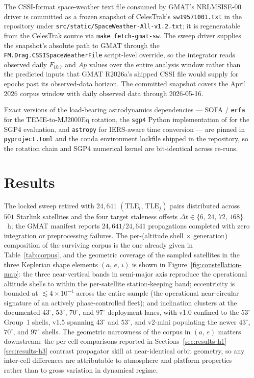 \documentclass[10pt, letterpaper]{article}
\begin{document}
The CSSI-format space-weather text file consumed by GMAT's NRLMSISE-00
driver is committed as a frozen snapshot of CelesTrak's
\texttt{sw19571001.txt} in the repository under
\texttt{src/static/\allowbreak SpaceWeather-\allowbreak All-\allowbreak v1.2.\allowbreak txt}; it is regeneratable
from the CelesTrak source via \texttt{make fetch-gmat-sw}. The sweep
driver supplies the snapshot's absolute path to GMAT through the
\texttt{FM.Drag.\allowbreak CSSISpaceWeatherFile} script-level
override, so the integrator reads observed daily $F_{10.7}$ and $Ap$
values over the entire analysis window rather than the predicted
inputs that GMAT R2026a's shipped CSSI file would supply for epochs
past its observed-data horizon. The committed snapshot covers the
April 2026 corpus window with daily observed data through 2026-05-16.

Exact versions of the load-bearing
astrodynamics dependencies --- SOFA / \texttt{erfa} for the
TEME-to-MJ2000Eq rotation, the \texttt{sgp4} Python implementation
of \citet{rhodes_sgp4} for the SGP4 evaluation, and \texttt{astropy}
for IERS-aware time conversion --- are pinned in
\texttt{pyproject.toml} and the conda environment lockfile shipped
in the repository, so the rotation chain and SGP4 numerical kernel
are bit-identical across re-runs.

\section{Results}
\label{sec:results}

The locked sweep retired with $24{,}641$
$(\mathrm{TLE}_{i},\,\mathrm{TLE}_{j})$ pairs distributed across $501$
Starlink satellites and the four target staleness offsets
$\Delta t \in \{6,\,24,\,72,\,168\}$~h; the GMAT manifest reports
$24{,}641 / 24{,}641$ propagations completed with zero integration or
preprocessing failures. The per-(altitude shell $\times$ generation)
composition of the surviving corpus is the one already given in
Table~\ref{tab:corpus}, and the geometric coverage of the sampled
satellites in the three Keplerian shape elements $(a,\,e,\,i)$ is shown
in Figure~\ref{fig:constellation-map}: the three near-vertical bands
in semi-major axis reproduce the operational altitude shells to within
the per-satellite station-keeping band; eccentricity is bounded at
$\lesssim 4\times 10^{-4}$ across the entire sample (the operational
near-circular signature of an actively phase-controlled fleet); and
inclination clusters at the documented $43^{\circ}$, $53^{\circ}$,
$70^{\circ}$, and $97^{\circ}$ deployment lanes, with v1.0 confined to
the $53^{\circ}$ Group~1 shells, v1.5 spanning $43^{\circ}$ and
$53^{\circ}$, and v2-mini populating the newer $43^{\circ}$,
$70^{\circ}$, and $97^{\circ}$ shells. The geometric narrowness of the
corpus in $(a,\,e)$ matters downstream: the per-cell comparisons
reported in Sections~\ref{sec:results-h1}--\ref{sec:results-h3}
contrast propagator skill at near-identical orbit geometry, so any
inter-cell differences are attributable to atmosphere and platform
properties rather than to gross variation in dynamical regime.
\end{document}
